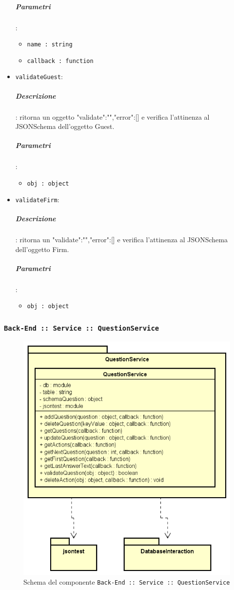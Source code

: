 \documentclass[../DefinizioneDiProdotto_v3.0.0.tex]{subfiles}
\begin{document}
\begin{itemize}
\subparagraph{Parametri}: \begin{itemize}
\item \texttt{name : string}
\item \texttt{callback : function}
\end{itemize}
\item \texttt{validateGuest}:
\subparagraph{Descrizione}: ritorna un oggetto {"validate":"","error":[]} e verifica l'attinenza al JSONSchema dell'oggetto Guest.
\subparagraph{Parametri}: \begin{itemize}
\item \texttt{obj : object}
\end{itemize}
\item \texttt{validateFirm}:
\subparagraph{Descrizione}: ritorna un {"validate":"","error":[]}  e verifica l'attinenza al JSONSchema dell'oggetto Firm.
\subparagraph{Parametri}: \begin{itemize}
\item \texttt{obj : object}
\end{itemize}
\end{itemize}
\newpage

\subsubsection{\texttt{Back-End :: Service :: QuestionService}}
\begin{figure}[!h]
	\centering
	\includegraphics[scale=0.7]{Architettura/Back-End/Service/QuestionService.png}
	\caption{Schema del componente \texttt{Back-End :: Service :: QuestionService}}
\end{figure}
\end{document}
